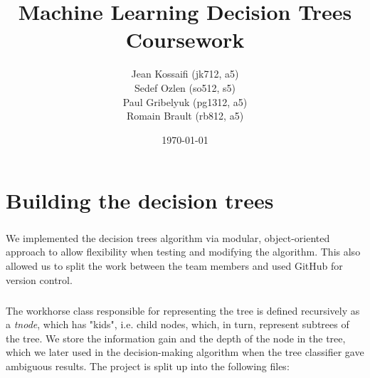 \documentclass[a4paper,12pt,oneside,final]{report}
\author{Jean Kossaifi (jk712, a5) \\Sedef Ozlen (so512, s5) \\Paul Gribelyuk (pg1312, a5) \\Romain Brault (rb812, a5)}
\title{\Huge Machine Learning Decision Trees Coursework}
\date{\today}
\begin{document}
\maketitle
\tableofcontents
\listoffigures
\chapter{Building the decision trees}
\paragraph{}
We implemented the decision trees algorithm via modular, object-oriented approach to allow flexibility when testing and modifying the algorithm.  This also allowed us to split the work between the team members and used GitHub for version control.
\paragraph{}
The workhorse class responsible for representing the tree is defined recursively as a \emph{tnode}, which has "kids", i.e. child nodes, which, in turn, represent subtrees of the tree.  We store the information gain and the depth of the node in the tree, which we later used in the decision-making algorithm when the tree classifier gave ambiguous results.  The project is split up into the following files:
\end{document}
